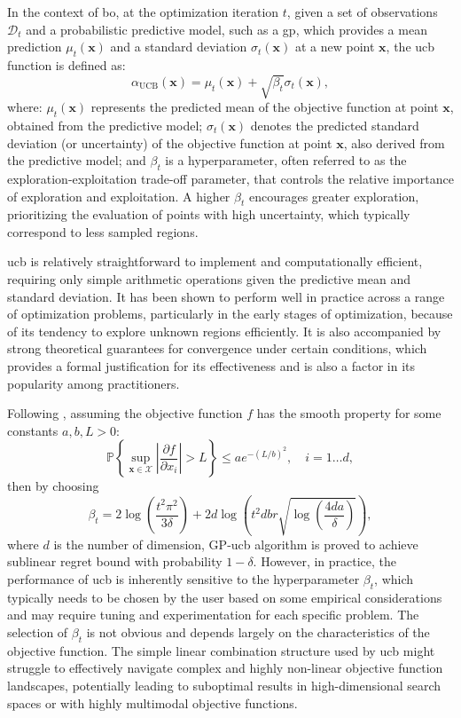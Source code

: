In the context of \ac{bo}, at the optimization iteration $t$, given a set of observations $\mathcal{D}_t$ and a probabilistic predictive model, such as a \ac{gp}, which provides a mean prediction \(\mu_t(\mathbf{x})\) and a standard deviation \(\sigma_t(\mathbf{x})\) at a new point \(\mathbf{x}\), the \ac{ucb} function is defined as:
\begin{equation*}
\alpha_{\text{UCB}}(\mathbf{x}) = \mu_t(\mathbf{x}) + \sqrt{\beta_t} \sigma_t(\mathbf{x}),
\label{eq:ucb_formula}
\end{equation*}
where: \(\mu_t(\mathbf{x})\) represents the predicted mean of the objective function at point \(\mathbf{x}\), obtained from the predictive model; \(\sigma_t(\mathbf{x})\) denotes the predicted standard deviation (or uncertainty) of the objective function at point \(\mathbf{x}\), also derived from the predictive model; and \(\beta_t\) is a hyperparameter, often referred to as the exploration-exploitation trade-off parameter, that controls the relative importance of exploration and exploitation. A higher \(\beta_t\) encourages greater exploration, prioritizing the evaluation of points with high uncertainty, which typically correspond to less sampled regions.

\ac{ucb} is relatively straightforward to implement and computationally efficient, requiring only simple arithmetic operations given the predictive mean and standard deviation. It has been shown to perform well in practice across a range of optimization problems, particularly in the early stages of optimization, because of its tendency to explore unknown regions efficiently. It is also accompanied by strong theoretical guarantees for convergence under certain conditions, which provides a formal justification for its effectiveness and is also a factor in its popularity among practitioners.

Following \citep{srinivas2009gaussian}, assuming the objective function $f$ has the smooth property for some constants $a, b, L > 0$:
\[
\mathbb{P} \left\{ \sup_{\mathbf{x} \in \mathcal{X}} \left \vert \frac{\partial f}{\partial x_i} \right \vert > L \right\} \leq a e^{-(L/b)^2}, \quad i=1 \ldots d, 
\]
then by choosing
\[
\beta_t = 2 \log \left( \frac{t^2 \pi^2}{3\delta} \right) + 2d \log \left( t^2 dbr \sqrt{\log \left( \frac{4da}{\delta} \right) } \right),
\]
where $d$ is the number of dimension, GP-\ac{ucb} algorithm is proved to achieve sublinear regret bound with probability $1 - \delta$. However, in practice, the performance of \ac{ucb} is inherently sensitive to the hyperparameter \(\beta_t\), which typically needs to be chosen by the user based on some empirical considerations and may require tuning and experimentation for each specific problem. The selection of \(\beta_t\) is not obvious and depends largely on the characteristics of the objective function. 
The simple linear combination structure used by \ac{ucb} might struggle to effectively navigate complex and highly non-linear objective function landscapes, potentially leading to suboptimal results in high-dimensional search spaces or with highly multimodal objective functions.

